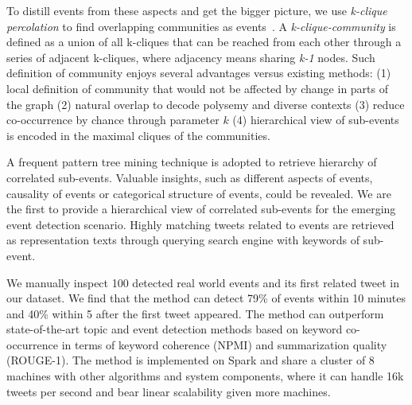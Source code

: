 To distill events from these aspects and get the bigger picture,
we use \emph{k-clique percolation} to find overlapping communities as events~\cite{palla2005uncovering}.
A \emph{k-clique-community} is defined as a union of all k-cliques that can be reached from each other through a series of
adjacent k-cliques, where adjacency means sharing \emph{k-1} nodes.
Such definition of community enjoys several advantages versus existing methods:
(1) local definition of community that would not be affected by change in parts of the graph
(2) natural overlap to decode polysemy and diverse contexts
(3) reduce co-occurrence by chance through parameter $k$
(4) hierarchical view of sub-events is encoded in the maximal cliques of the communities.

A frequent pattern tree mining technique is adopted to retrieve hierarchy of correlated sub-events.
Valuable insights, such as different aspects of events, causality of events or categorical structure of events, could be revealed.
We are the first to provide a hierarchical view of correlated sub-events for the emerging event detection scenario.
Highly matching tweets related to events are retrieved as representation texts through querying search engine with keywords of sub-event.

We manually inspect 100 detected real world events and its first related tweet in our dataset.
We find that the method can detect 79\% of events within 10 minutes and 40\% within 5 after the first tweet appeared.
The method can outperform state-of-the-art topic and event detection methods based on keyword
co-occurrence \cite{weng2011event, sayyadi2013toit, yan2013biterm} in terms of keyword coherence (NPMI) and summarization quality (ROUGE-1).
The method is implemented on Spark and share a cluster of 8 machines
with other algorithms and system components, where it can handle 16k tweets per second and bear linear scalability given more machines.

